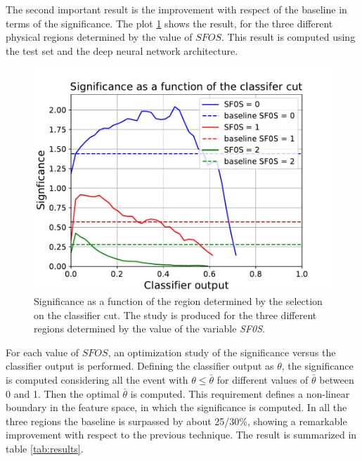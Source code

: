 \documentclass{article}
\begin{document}
The second important result is the improvement with respect of the baseline in terms of the significance. The plot \ref{fig:significance} shows the result, for the three different physical regions determined by the value of $SFOS$. This result is computed using the test set and the deep neural network architecture.

\begin{figure}[!h]
  \centering
  \includegraphics[width=\columnwidth]{significance_with_cuts.pdf}
  \caption{Significance as a function of the region determined by the selection on the classifier cut. The study is produced for the three different regions determined by the value of the variable \textit{SF0S}.}
  \label{fig:significance}
\end{figure}

For each value of $SFOS$, an optimization study of the significance versus the classifier output is performed. Defining the classifier output as $\theta$, the significance is computed considering all the event with $\theta \leq \bar{\theta}$ for different values of $\bar{\theta}$ between 0 and 1. Then the optimal $\bar{\theta}$ is computed. This requirement defines a non-linear boundary in the feature space, in which the significance is computed. In all the three regions the baseline is surpassed by about 25/30\%, showing a remarkable improvement with respect to the previous technique. The result is summarized in table \ref{tab:results}.
\end{document}
